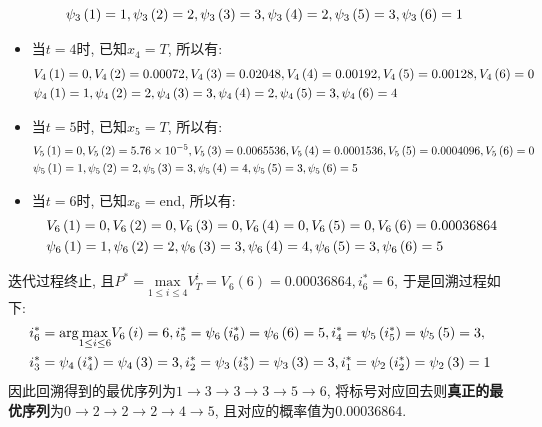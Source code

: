 \documentclass{article}
\begin{document}
\begin{homeworkProblem}
\begin{itemize}
\begin{align}
			\\
			&\psi _3\left( 1 \right) =1,\psi _3\left( 2 \right) =2,\psi _3\left( 3 \right) =3,\psi _3\left( 4 \right) =2,\psi _3\left( 5 \right) =3,\psi _3\left( 6 \right) =1 \notag
		\end{align}
		\item 当$t=4$时, 已知$x_4=T$, 所以有:
		\begin{align}
			&V_4\left( 1 \right) =0,V_4\left( 2 \right) =0.00072,V_4\left( 3 \right) =0.02048,V_4\left( 4 \right) =0.00192,V_4\left( 5 \right) =0.00128,V_4\left( 6 \right) =0 \notag
			\\
			&\psi _4\left( 1 \right) =1,\psi _4\left( 2 \right) =2,\psi _4\left( 3 \right) =3,\psi _4\left( 4 \right) =2,\psi _4\left( 5 \right) =3,\psi _4\left( 6 \right) =4 \notag
		\end{align}
		\item 当$t=5$时, 已知$x_5=T$, 所以有:
		\begin{align}
			&V_5\left( 1 \right) =0,V_5\left( 2 \right) =5.76\times 10^{-5},V_5\left( 3 \right) =0.0065536,V_5\left( 4 \right) =0.0001536,V_5\left( 5 \right) =0.0004096,V_5\left( 6 \right) =0 \notag
			\\
			&\psi _5\left( 1 \right) =1,\psi _5\left( 2 \right) =2,\psi _5\left( 3 \right) =3,\psi _5\left( 4 \right) =4,\psi _5\left( 5 \right) =3,\psi _5\left( 6 \right) =5 \notag
		\end{align}
		\item 当$t=6$时, 已知$x_6=\text{end}$, 所以有:
		\begin{align}
			&V_6\left( 1 \right) =0,V_6\left( 2 \right) =0,V_6\left( 3 \right) =0,V_6\left( 4 \right) =0,V_6\left( 5 \right) =0,V_6\left( 6 \right) =0.00036864 \notag
			\\
			&\psi _6\left( 1 \right) =1,\psi _6\left( 2 \right) =2,\psi _6\left( 3 \right) =3,\psi _6\left( 4 \right) =4,\psi _6\left( 5 \right) =3,\psi _6\left( 6 \right) =5 \notag
		\end{align}
	\end{itemize}
	迭代过程终止, 且$\displaystyle P^{\ast}=\underset{1\le i\le 4}{\text{max}}V_{T}^{i}=V_{6}(6)=0.00036864,i_{6}^{\ast}=6$, 于是回溯过程如下:
	\begin{align}
		&i_{6}^{\ast}=\text{arg} \underset{1\le i\le 6}{\text{max}}V_6\left( i \right) =6,i_{5}^{\ast}=\psi _6\left( i_{6}^{\ast} \right) =\psi _6\left( 6 \right) =5,i_{4}^{\ast}=\psi _5\left( i_{5}^{\ast} \right) =\psi _5\left( 5 \right) =3, \notag
		\\
		&i_{3}^{\ast}=\psi _4\left( i_{4}^{\ast} \right) =\psi _4\left( 3 \right) =3,i_{2}^{\ast}=\psi _3\left( i_{3}^{\ast} \right) =\psi _3\left( 3 \right) =3,i_{1}^{\ast}=\psi _2\left( i_{2}^{\ast} \right) =\psi _2\left( 3 \right) =1 \notag
	\end{align}
	因此回溯得到的最优序列为$1\to 3 \to 3 \to 3 \to 5 \to 6$, 将标号对应回去则\textbf{真正的最优序列}为$0\to 2 \to 2 \to 2 \to 4 \to 5$, 且对应的概率值为$0.00036864$.


\end{homeworkProblem}
\end{document}
